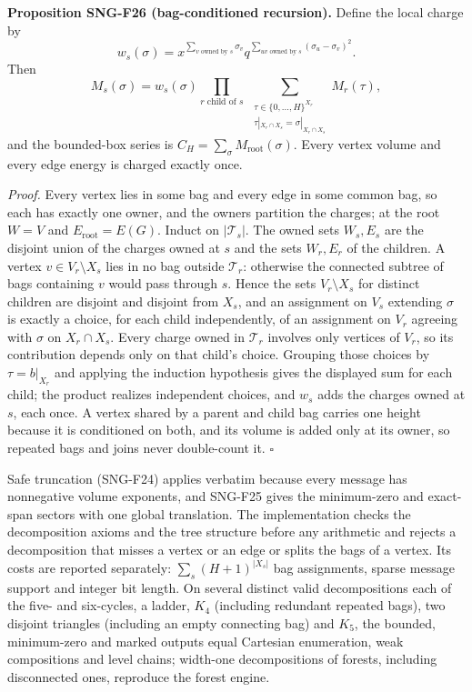 \documentclass[
  11pt,
  a4paper,
]{report}
\let\singularitytexttt\texttt
\renewcommand{\texttt}[1]{\singularitytexttt{\seqsplit{#1}}}
\begin{document}
\textbf{Proposition SNG-F26 (bag-conditioned recursion).} Define the
local charge by \[
w_s(\sigma)=x^{\sum_{v\text{ owned by }s}\sigma_v}
q^{\sum_{uv\text{ owned by }s}(\sigma_u-\sigma_v)^2}.
\] Then \[
M_s(\sigma)=w_s(\sigma)\prod_{r\text{ child of }s}\ \sum_{\substack{\tau\in\{0,\ldots,H\}^{X_r}\\ \tau|_{X_r\cap X_s}=\sigma|_{X_r\cap X_s}}}M_r(\tau),
\] and the bounded-box series is
\(C_H=\sum_\sigma M_{\mathrm{root}}(\sigma)\). Every vertex volume and
every edge energy is charged exactly once.

\emph{Proof.} Every vertex lies in some bag and every edge in some
common bag, so each has exactly one owner, and the owners partition the
charges; at the root \(W=V\) and \(E_{\mathrm{root}}=E(G)\). Induct on
\(|\mathcal T_s|\). The owned sets \(W_s,E_s\) are the disjoint union of
the charges owned at \(s\) and the sets \(W_r,E_r\) of the children. A
vertex \(v\in V_r\setminus X_s\) lies in no bag outside
\(\mathcal T_r\): otherwise the connected subtree of bags containing
\(v\) would pass through \(s\). Hence the sets \(V_r\setminus X_s\) for
distinct children are disjoint and disjoint from \(X_s\), and an
assignment on \(V_s\) extending \(\sigma\) is exactly a choice, for each
child independently, of an assignment on \(V_r\) agreeing with
\(\sigma\) on \(X_r\cap X_s\). Every charge owned in \(\mathcal T_r\)
involves only vertices of \(V_r\), so its contribution depends only on
that child's choice. Grouping those choices by \(\tau=b|_{X_r}\) and
applying the induction hypothesis gives the displayed sum for each
child; the product realizes independent choices, and \(w_s\) adds the
charges owned at \(s\), each once. A vertex shared by a parent and child
bag carries one height because it is conditioned on both, and its volume
is added only at its owner, so repeated bags and joins never
double-count it. \(\square\)

Safe truncation (SNG-F24) applies verbatim because every message has
nonnegative volume exponents, and SNG-F25 gives the minimum-zero and
exact-span sectors with one global translation. The implementation
\texttt{src/singularity/decomposition.py} checks the decomposition
axioms and the tree structure before any arithmetic and rejects a
decomposition that misses a vertex or an edge or splits the bags of a
vertex. Its costs are reported separately: \(\sum_s(H+1)^{|X_s|}\) bag
assignments, sparse message support and integer bit length. On several
distinct valid decompositions each of the five- and six-cycles, a
ladder, \(K_4\) (including redundant repeated bags), two disjoint
triangles (including an empty connecting bag) and \(K_5\), the bounded,
minimum-zero and marked outputs equal Cartesian enumeration, weak
compositions and level chains; width-one decompositions of forests,
including disconnected ones, reproduce the forest engine.
\end{document}
